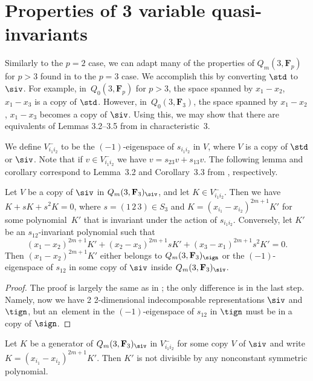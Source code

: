 \section[Properties of 3 variable quasi-invariants]{Properties of $\boldsymbol{3}$ variable quasi-invariants}\label{sec:wang}
Similarly to the $p=2$ case, we can adapt many of the properties of $Q_m(3,\mathbf{F}_p)$ for $p>3$ found in \cite{wang2022explicit} to the $p=3$ case. We accomplish this by converting $\std$ to $\siv$. For example, in~$Q_0(3,\mathbf{F}_p)$ for $p>3$, the space spanned by $x_1-x_2$, $x_1-x_3$ is a copy of $\std$. However, in~$Q_0(3,\mathbf{F}_3)$, the space spanned by $x_1-x_2$, $x_1-x_3$ becomes a copy of $\siv$. Using this, we may show that there are equivalents of Lemmas 3.2--3.5 from \cite{wang2022explicit} in characteristic~$3$.

We define $V_{i_1i_2}^{-}$ to be the $(-1)$-eigenspace of $s_{i_1i_2}$ in $V$, where $V$ is a copy of $\std$ or $\siv$. Note that if $v\in V_{i_1i_2}^{-}$ we have $v=s_{23}v+s_{13}v$. The following lemma and corollary correspond to Lemma~3.2 and Corollary~3.3 from \cite{wang2022explicit}, respectively.

\begin{Lemma}\label{lem:3.1}
 Let $V$ be a copy of $\siv$ in $Q_m(3,\mathbf{F}_3)_{\siv}$, and let $K\in V_{i_1i_2}^{-}$. Then we have $K+sK+s^2K=0$, where $s=(1\,2\,3)\in S_3$ and $K=(x_{i_1}-x_{i_2})^{2m+1}K'$ for some polynomial~$K'$ that is invariant under the action of $s_{i_1i_2}$. Conversely, let $K'$ be an $s_{12}$-invariant polynomial such that
 \[(x_1-x_2)^{2m+1}K'+(x_2-x_3)^{2m+1}sK'+(x_3-x_1)^{2m+1}s^2K'=0.\]
 Then $(x_1-x_2)^{2m+1}K'$ either belongs to $Q_m(3,\mathbf{F}_3)_\sign$ or the $(-1)$-eigenspace of $s_{12}$ in some copy of $\siv$ inside $Q_m(3,\mathbf{F}_3)_\siv$.
\end{Lemma}

\begin{proof}
 The proof is largely the same as in \cite{wang2022explicit}; the only difference is in the last step. Namely, now we have 2 2-dimensional indecomposable representations $\siv$ and $\tign$, but an~element in the $(-1)$-eigenspace of $s_{12}$ in $\tign$ must be in a copy of $\sign$.
\end{proof}

\begin{Corollary}\label{cor:3.2}
 Let $K$ be a generator of $Q_m(3,\mathbf{F}_3)_\siv$ in $V_{i_1i_2}^-$ for some copy $V$ of $\siv$ and write $K=(x_{i_1}-x_{i_2})^{2m+1}K'$. Then $K'$ is not divisible by any nonconstant symmetric polynomial.
\end{Corollary}

